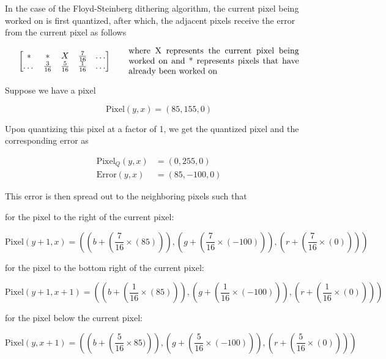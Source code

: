\documentclass{article}
\begin{document}
\medskip

\noindent In the case of the Floyd-Steinberg dithering algorithm, the current pixel being worked on is first quantized, after which, the adjacent pixels receive the error from the current pixel as follows

\medskip
\renewcommand{\arraystretch}{1.5}
$$
    \begin{bmatrix}
        *   &      *      &      X      & \frac{7}{16} & \dots \\
      \dots & \frac{3}{16} & \frac{5}{16} & \frac{1}{16} & \dots \\
     
    \end{bmatrix} \qquad
    \text{\parbox{7cm}{where X represents the current pixel being worked on and * represents pixels that have already been worked on }}
$$

\medskip
\noindent Suppose we have a pixel

$$\text{Pixel}(y,x) = (85,155,0)$$

\noindent Upon quantizing this pixel at a factor of 1, we get the quantized pixel and the corresponding error as

\begin{align*}
\text{Pixel}_Q(y,x) &= (0,255,0) \\
\text{Error}(y,x) &= (85,-100,0)
\end{align*}

\noindent This error is then spread out to the neighboring pixels such that

\medskip
\noindent for the pixel to the right of the current pixel:

$$
    \text{Pixel}(y+1,x) = \left(\left(b+\left(\frac{7}{16}\times(85)\right)\right),\left(g+\left(\frac{7}{16}\times(-100)\right)\right),\left(r+\left(\frac{7}{16}\times(0)\right)\right)\right)  
$$

\noindent for the pixel to the bottom right of the current pixel:

$$
    \text{Pixel}(y+1,x+1) = \left(\left(b+\left(\frac{1}{16}\times(85)\right)\right),\left(g+\left(\frac{1}{16}\times(-100)\right)\right),\left(r+\left(\frac{1}{16}\times(0)\right)\right)\right)
$$

\noindent for the pixel below the current pixel:

$$
    \text{Pixel}(y,x+1) = \left(\left(b+\left(\frac{5}{16}\times85)\right)\right),\left(g+\left(\frac{5}{16}\times(-100)\right)\right),\left(r+\left(\frac{5}{16}\times(0)\right)\right)\right)
$$
\end{document}
